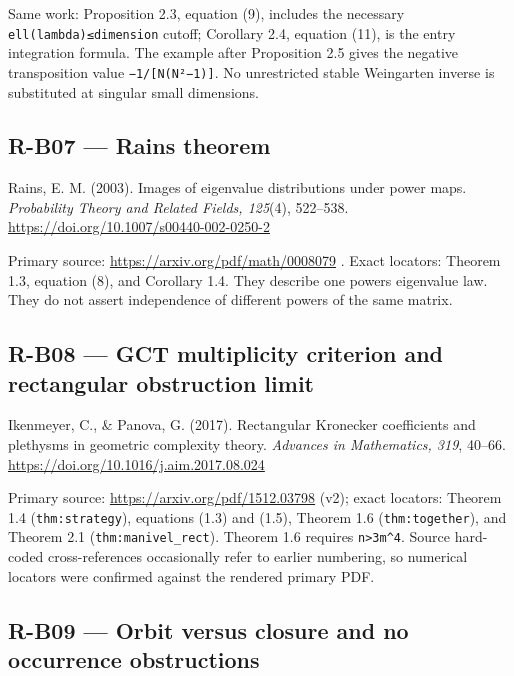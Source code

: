 \documentclass[11pt,a4paper]{article}
\theoremstyle{definition}\newtheorem{definition}{Definition}
\begin{document}
Same work: Proposition 2.3, equation (9), includes the necessary
\nolinkurl{ell(lambda)≤dimension} cutoff; Corollary 2.4, equation (11), is
the entry integration formula. The example after Proposition 2.5 gives
the negative transposition value \texttt{−1/{[}N(N²−1){]}}. No
unrestricted stable Weingarten inverse is substituted at singular small
dimensions.

\subsection{R-B07 --- Rains theorem}\label{r-b07--rains-theorem}

Rains, E. M. (2003). Images of eigenvalue distributions under power
maps. \emph{Probability Theory and Related Fields, 125}(4), 522--538.
\url{https://doi.org/10.1007/s00440-002-0250-2}

Primary source: \url{https://arxiv.org/pdf/math/0008079} . Exact
locators: Theorem 1.3, equation (8), and Corollary 1.4. They describe
one power\textquotesingle s eigenvalue law. They do not assert
independence of different powers of the same matrix.

\subsection{R-B08 --- GCT multiplicity criterion and rectangular
obstruction
limit}\label{r-b08--gct-multiplicity-criterion-and-rectangular-obstruction-limit}

Ikenmeyer, C., \& Panova, G. (2017). Rectangular Kronecker coefficients
and plethysms in geometric complexity theory. \emph{Advances in
Mathematics, 319}, 40--66.
\url{https://doi.org/10.1016/j.aim.2017.08.024}

Primary source: \url{https://arxiv.org/pdf/1512.03798} (v2); exact
locators: Theorem 1.4 (\nolinkurl{thm:strategy}), equations (1.3) and
(1.5), Theorem 1.6 (\nolinkurl{thm:together}), and Theorem 2.1
(\nolinkurl{thm:manivel_rect}). Theorem 1.6 requires
\texttt{n\textgreater{}3m\^{}4}. Source hard-coded cross-references
occasionally refer to earlier numbering, so numerical locators were
confirmed against the rendered primary PDF.

\subsection{R-B09 --- Orbit versus closure and no occurrence
obstructions}\label{r-b09--orbit-versus-closure-and-no-occurrence-obstructions}
\end{document}
